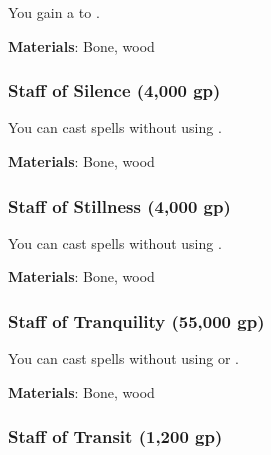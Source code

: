 You gain a   to .



\vspace{0.25em}
\textbf{Materials}: Bone, wood


\lowercase{\hypertarget{item:Staff of Silence}{}}\label{item:Staff of Silence}
\hypertarget{item:Staff of Silence}{\subsubsection{Staff of Silence\hfill{} (4,000 gp)}}

You can cast spells without using .



\vspace{0.25em}
\textbf{Materials}: Bone, wood


\lowercase{\hypertarget{item:Staff of Stillness}{}}\label{item:Staff of Stillness}
\hypertarget{item:Staff of Stillness}{\subsubsection{Staff of Stillness\hfill{} (4,000 gp)}}

You can cast spells without using .



\vspace{0.25em}
\textbf{Materials}: Bone, wood


\lowercase{\hypertarget{item:Staff of Tranquility}{}}\label{item:Staff of Tranquility}
\hypertarget{item:Staff of Tranquility}{\subsubsection{Staff of Tranquility\hfill{} (55,000 gp)}}

You can cast spells without using  or .



\vspace{0.25em}
\textbf{Materials}: Bone, wood


\lowercase{\hypertarget{item:Staff of Transit}{}}\label{item:Staff of Transit}
\hypertarget{item:Staff of Transit}{\subsubsection{Staff of Transit\hfill{} (1,200 gp)}}

